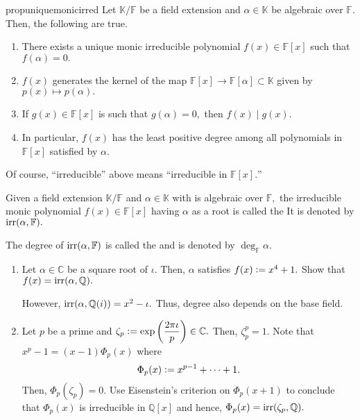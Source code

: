 \begin{restatable}[]{prop}{uniquemonicirred}
\label{prop:uniquemonicirred}
    Let $\mathbb{K}/\mathbb{F}$ be a field extension and $\alpha \in \mathbb{K}$ be algebraic over $\mathbb{F}.$ Then, the following are true. 
    \begin{enumerate}
        \item There exists a unique monic irreducible polynomial $f(x) \in \mathbb{F}[x]$ such that $f(\alpha) = 0.$ 
        \item $f(x)$ generates the kernel of the map $\mathbb{F}[x] \to \mathbb{F}[\alpha] \subset \mathbb{K}$ given by $p(x) \mapsto p(\alpha).$
        \item If $g(x) \in \mathbb{F}[x]$ is such that $g(\alpha) = 0,$ then $f(x) \mid g(x).$ 
        \item In particular, $f(x)$ has the least positive degree among all polynomials in $\mathbb{F}[x]$ satisfied by $\alpha.$ \hfill\hyperref[prop:uniquemonicirred2]{\downsym}
    \end{enumerate}

\end{restatable}

Of course, ``irreducible'' above means ``irreducible in $\mathbb{F}[x].$''

\begin{defn}%
    Given a field extension $\mathbb{K}/\mathbb{F}$ and $\alpha \in \mathbb{K}$ with is algebraic over $\mathbb{F},$ the irreducible monic polynomial $f(x) \in \mathbb{F}[x]$ having $\alpha$ as a root is called the  It is denoted by $\operatorname{irr}(\alpha, \mathbb{F}).$

    The degree of $\operatorname{irr}(\alpha, \mathbb{F})$ is called the  and is denoted by $\deg_{\mathbb{F}}\alpha.$
\end{defn}

\begin{ex}
    \phantom{hi}
    \begin{enumerate}
        \item Let $\alpha \in \mathbb{C}$ be a square root of $\iota.$ Then, $\alpha$ satisfies $f(x) \vcentcolon= x^4 + 1.$ Show that $f(x) = \operatorname{irr}(\alpha, \mathbb{Q}).$

        However, $\operatorname{irr}(\alpha, \mathbb{Q}(i)) = x^2 - \iota.$ Thus, degree also depends on the base field.
        \item Let $p$ be a prime and $\zeta_p \vcentcolon= \exp\left(\dfrac{2\pi\iota}{p}\right) \in \mathbb{C}.$ Then, $\zeta_p^p = 1.$ Note that $x^p - 1 = (x - 1)\Phi_p(x)$ where
        \begin{equation*} 
            \Phi_p(x) \vcentcolon= x^{p - 1} + \cdots + 1.
        \end{equation*}
        Then, $\Phi_p(\zeta_p) = 0.$ Use Eisenstein's criterion on $\Phi_p(x + 1)$ to conclude that $\Phi_p(x)$ is irreducible in $\mathbb{Q}[x]$ and hence, $\Phi_p(x) = \operatorname{irr}(\zeta_p, \mathbb{Q}).$
    \end{enumerate}
\end{ex}

